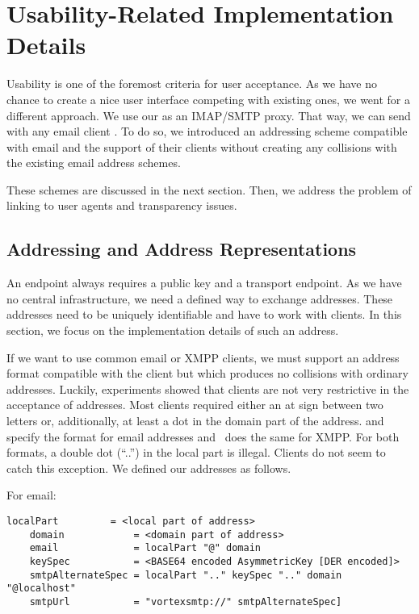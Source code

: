 \chapter{Usability-Related Implementation Details}\label{sec:usabilityImplementation}
Usability is one of the foremost criteria for user acceptance. As we have no chance to create a nice user interface competing with existing ones, we went for a different approach. We use our \VortexNode{} as an IMAP/SMTP proxy. That way, we can send with any email client \VortexMessages. To do so, we introduced an addressing scheme compatible with email and the support of their clients without creating any collisions with the existing email address schemes.

These schemes are discussed in the next section. Then, we address the problem of linking to user agents and transparency issues.

\section{Addressing and Address Representations}
An endpoint always requires a public key and a transport endpoint. As we have no central infrastructure, we need a defined way to exchange addresses. These addresses need to be uniquely identifiable and have to work with clients. In this section, we focus on the implementation details of such an address.

If we want to use common email or XMPP clients, we must support an address format compatible with the client but which produces no collisions with ordinary addresses. Luckily, experiments showed that clients are not very restrictive in the acceptance of addresses. Most clients required either an at sign between two letters or, additionally, at least a dot in the domain part of the address. \cite{rfc5321} and~\cite{rfc5322} specify the format for email addresses and~\cite{rfc6120} does the same for XMPP. For both formats, a double dot (``..'') in the local part is illegal. Clients do not seem to catch this exception. We defined our addresses as follows.


For email:
\begin{lstlisting}[language=EBNF]
	localPart         = <local part of address>
	domain            = <domain part of address>
	email             = localPart "@" domain
	keySpec           = <BASE64 encoded AsymmetricKey [DER encoded]>
	smtpAlternateSpec = localPart ".." keySpec ".." domain "@localhost"
	smtpUrl           = "vortexsmtp://" smtpAlternateSpec]
\end{lstlisting}

